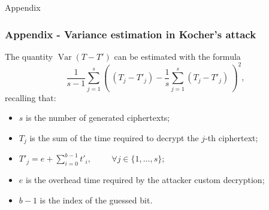 \documentclass{beamer}
\DeclareMathOperator{\Var}{Var}
\begin{document}
\endgroup
\appendix
\begin{frame}[c,noframenumbering]

  \Huge Appendix

\end{frame}
\begin{frame}
\frametitle{Appendix - Variance estimation in Kocher's attack}

The quantity $\Var(T - T')$ can be estimated with the formula $$\
  \frac{1}{s - 1}\sum_{j = 1}^s \left( \
    (T_j - T'_j) - \frac{1}{s}\sum_{j = 1}^s (T_j - T'_j) \
  \right)^2, \
$$
recalling that:
\begin{itemize}
  \item $s$ is the number of generated ciphertexts;
  \item $T_j$ is the sum of the time required to decrypt the $j$-th ciphertext;
  \item $T'_j = e + \sum_{i = 0}^{b - 1} t'_i, \hspace{1cm} \forall j \in \{ 1, \dots, s\}$;
  \item $e$ is the overhead time required by the attacker custom decryption;
  \item $b - 1$ is the index of the guessed bit.
\end{itemize}

\end{frame}
\end{document}
